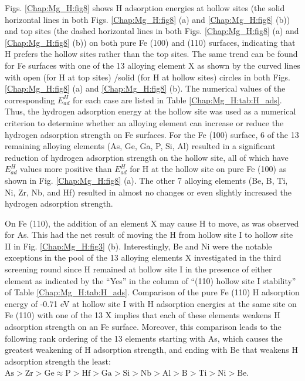 Figs. \ref{Chap:Mg_H:fig8} shows H adsorption energies at hollow sites (the solid horizontal lines in both Figs. \ref{Chap:Mg_H:fig8} (a) and \ref{Chap:Mg_H:fig8} (b)) and top sites (the dashed horizontal lines in both Figs. \ref{Chap:Mg_H:fig8} (a) and \ref{Chap:Mg_H:fig8} (b)) on both pure Fe (100) and (110) surfaces, indicating that H prefers the hollow sites rather than the top sites. The same trend can be found for Fe surfaces with one of the 13 alloying element X as shown by the curved lines with open (for H at top sites) /solid (for H at hollow sites) circles in both Figs. \ref{Chap:Mg_H:fig8} (a) and \ref{Chap:Mg_H:fig8} (b). The numerical values of the corresponding $E_{ad}^H$ for each case are listed in Table \ref{Chap:Mg_H:tab:H_ads}. Thus, the hydrogen adsorption energy at the hollow site was used as a numerical criterion to determine whether an alloying element can increase or reduce the hydrogen adsorption strength on Fe surfaces. For the Fe (100) surface, 6 of the 13 remaining alloying elements (As, Ge, Ga, P, Si, Al) resulted in a significant reduction of hydrogen adsorption strength on the hollow site, all of which have $E_{ad}^H$ values more positive than $E_{ad}^H$ for H at the hollow site on pure Fe (100) as shown in Fig. \ref{Chap:Mg_H:fig8} (a). The other 7 alloying elements (Be, B, Ti, Ni, Zr, Nb, and Hf) resulted in almost no changes or even slightly increased the hydrogen adsorption strength.


On Fe (110), the addition of an element X may cause H to move, as was observed for As. This had the net result of moving the H from hollow site I to hollow site II in Fig. \ref{Chap:Mg_H:fig3} (b). Interestingly, Be and Ni were the notable exceptions in the pool of the 13 alloying elements X investigated in the third screening round since H remained at hollow site I in the presence of either element as indicated by the ``Yes'' in the column of ``(110) hollow site I stability'' of Table \ref{Chap:Mg_H:tab:H_ads}. Comparison of the pure Fe (110) H adsorption energy of -0.71 eV at hollow site I with H adsorption energies at the same site on Fe (110) with one of the 13 X implies that each of these elements weakens H adsorption strength on an Fe surface. Moreover, this comparison leads to the following rank ordering of the 13 elements starting with As, which causes the greatest weakening of H adsorption strength, and ending with Be that weakens H adsorption strength the least: $\text{As} > \text{Zr} > \text{Ge} \approx \text{P} > \text{Hf} > \text{Ga} > \text{Si} > \text{Nb} > \text{Al} > \text{B} > \text{Ti} > \text{Ni} > \text{Be}$.


